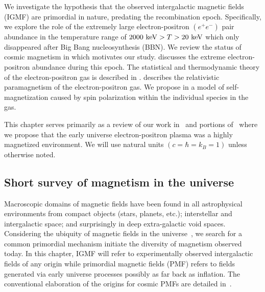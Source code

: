 \noindent We investigate the hypothesis that the observed intergalactic magnetic fields (IGMF) are primordial in nature, predating the recombination epoch. Specifically, we explore the role of the extremely large electron-positron $(e^{+}e^{-})$ pair abundance in the temperature range of $2000\text{ keV}>T>20\text{ keV}$ which only disappeared after Big Bang nucleosynthesis (BBN). We review the status of cosmic magnetism in  which motivates our study.  discusses the extreme electron-positron abundance during this epoch. The statistical and thermodynamic theory of the electron-positron gas is described in .  describes the relativistic paramagnetism of the electron-positron gas. We propose in  a model of self-magnetization caused by spin polarization within the individual species in the gas.

This chapter serves primarily as a review of our work in~\cite{Steinmetz:2023nsc,Steinmetz:2023ucp} and portions of~\cite{Rafelski:2023emw} where we propose that the early universe electron-positron plasma was a highly magnetized environment. We will use natural units $(c=\hbar=k_{B}=1)$ unless otherwise noted.

\subsection{Short survey of magnetism in the universe}
\label{sec:universe}
\noindent Macroscopic domains of magnetic fields have been found in all astrophysical environments from compact objects (stars, planets, etc.); interstellar and intergalactic space; and surprisingly in deep extra-galactic void spaces. Considering the ubiquity of magnetic fields in the universe~\cite{Giovannini:2017rbc,Giovannini:2003yn,Kronberg:1993vk}, we search for a common primordial mechanism initiate the diversity of magnetism observed today. In this chapter, IGMF will refer to experimentally observed intergalactic fields of any origin while primordial magnetic fields (PMF) refers to fields generated via early universe processes possibly as far back as inflation. The conventional elaboration of the origins for cosmic PMFs are detailed in~\cite{Gaensler:2004gk,Durrer:2013pga,AlvesBatista:2021sln}.

